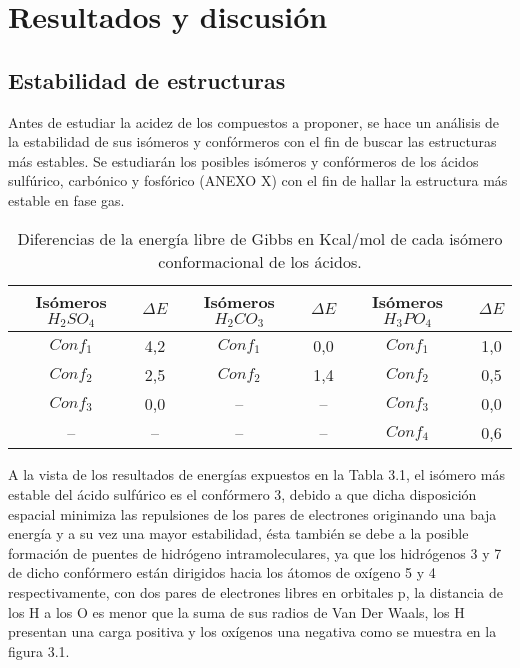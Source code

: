 \chapter{Resultados y discusión}

\section{Estabilidad de estructuras}

Antes de estudiar la acidez de los compuestos a proponer, se hace un análisis de la estabilidad de sus isómeros y confórmeros con el fin de buscar las estructuras más estables. 
Se estudiarán los posibles isómeros y confórmeros de los ácidos sulfúrico, carbónico y fosfórico (ANEXO X) con el fin de hallar la estructura más estable en fase gas. \\

  \begin{table}[H]
\begin{center}
\begin{tabular}{|c|c|c|c|c|c|}
\hline
Isómeros $H_2SO_4$ & $\Delta E$ & Isómeros $H_2CO_3$ & $\Delta E$ & Isómeros $H_3PO_4$ & $\Delta E$ \\ \hline
$Conf_1$ & 4,2 & $Conf_1$ & 0,0 & $Conf_1$ & 1,0 \\ \hline
$Conf_2$ & 2,5 & $Conf_2$ & 1,4 & $Conf_2$ & 0,5 \\ \hline
$Conf_3$ & 0,0 & -- & -- & $Conf_3$ & 0,0 \\ \hline
-- & -- & -- & -- & $Conf_4$ & 0,6 \\ \hline
\end{tabular}
\caption{Diferencias de la energía libre de Gibbs en Kcal/mol de cada isómero conformacional de los ácidos.}
\label{tab:3.1}
\end{center}
\end{table}
A la vista de los resultados de energías expuestos en la Tabla 3.1, el isómero más estable del ácido sulfúrico es el confórmero 3, debido a que dicha disposición espacial minimiza las repulsiones de los pares de electrones originando una baja energía y a su vez una mayor estabilidad, ésta también se debe a la posible formación de puentes de hidrógeno intramoleculares, ya que los hidrógenos 3 y 7 de dicho confórmero están dirigidos hacia los átomos de oxígeno 5 y 4 respectivamente, con dos pares de electrones libres en orbitales p, la distancia de los H a los O es menor que la suma de sus radios de Van Der Waals, los H presentan una carga positiva y los oxígenos una negativa como se muestra en la figura 3.1. \\

